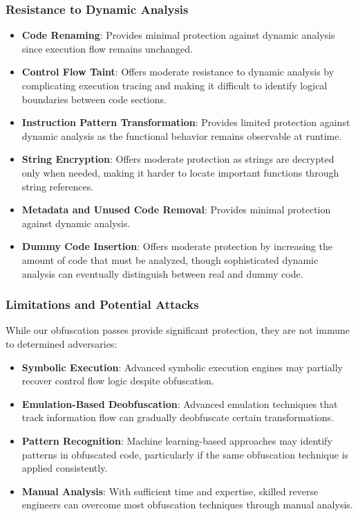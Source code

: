 \documentclass[conference]{IEEEtran}
\begin{document}
\subsubsection{Resistance to Dynamic Analysis}
\begin{itemize}
    \item \textbf{Code Renaming}: Provides minimal protection against dynamic analysis since execution flow remains unchanged.
    
    \item \textbf{Control Flow Taint}: Offers moderate resistance to dynamic analysis by complicating execution tracing and making it difficult to identify logical boundaries between code sections.
    
    \item \textbf{Instruction Pattern Transformation}: Provides limited protection against dynamic analysis as the functional behavior remains observable at runtime.
    
    \item \textbf{String Encryption}: Offers moderate protection as strings are decrypted only when needed, making it harder to locate important functions through string references.
    
    \item \textbf{Metadata and Unused Code Removal}: Provides minimal protection against dynamic analysis.
    
    \item \textbf{Dummy Code Insertion}: Offers moderate protection by increasing the amount of code that must be analyzed, though sophisticated dynamic analysis can eventually distinguish between real and dummy code.
\end{itemize}

\subsubsection{Limitations and Potential Attacks}
While our obfuscation passes provide significant protection, they are not immune to determined adversaries:

\begin{itemize}
    \item \textbf{Symbolic Execution}: Advanced symbolic execution engines may partially recover control flow logic despite obfuscation.
    
    \item \textbf{Emulation-Based Deobfuscation}: Advanced emulation techniques that track information flow can gradually deobfuscate certain transformations.
    
    \item \textbf{Pattern Recognition}: Machine learning-based approaches may identify patterns in obfuscated code, particularly if the same obfuscation technique is applied consistently.
    
    \item \textbf{Manual Analysis}: With sufficient time and expertise, skilled reverse engineers can overcome most obfuscation techniques through manual analysis.
\end{itemize}
\end{document}
